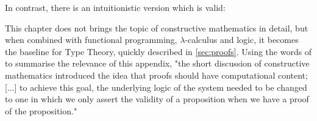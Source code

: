 \begin{prooftree}\label{proofintuit}
\end{prooftree}

In contrast, there is an intuitionistic version which is valid:

\begin{prooftree}\label{proofintuitvalid}
\end{prooftree}

This chapter does not brings the topic of constructive mathematics in detail, but when combined with functional programming, $\lambda$-calculus and logic, it becomes the baseline for Type Theory, quickly described in \ref{sec:proofs}. Using the words of \cite{thompson1991type} to summarise the relevance of this appendix, "the short discussion of constructive mathematics introduced the idea that proofs should have computational content; [...] to achieve this goal, the underlying logic of the system needed to be changed to one in which we only assert the validity of a proposition when we have a proof of the proposition."


